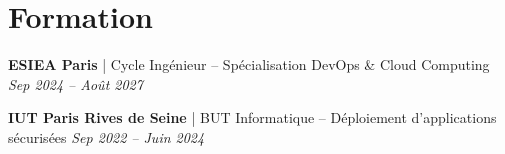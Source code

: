 \section{\icon{\faGraduationCap} Formation}

\textbf{\color{accent}ESIEA Paris}
\textcolor{muted}{| Cycle Ing\'{e}nieur -- Sp\'{e}cialisation DevOps \& Cloud Computing}
\hfill \textit{\small Sep 2024 -- Ao\^{u}t 2027}

\vspace{0.15cm}
\textbf{\color{accent}IUT Paris Rives de Seine}
\textcolor{muted}{| BUT Informatique -- D\'{e}ploiement d'applications s\'{e}curis\'{e}es}
\hfill \textit{\small Sep 2022 -- Juin 2024}
